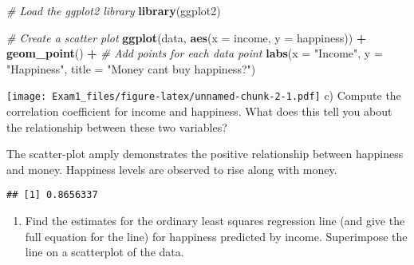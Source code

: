 \documentclass[
]{article}
\newenvironment{Shaded}{\begin{snugshade}}{\end{snugshade}}
\newcommand{\AttributeTok}[1]{\textcolor[rgb]{0.13,0.29,0.53}{#1}}
\newcommand{\CommentTok}[1]{\textcolor[rgb]{0.56,0.35,0.01}{\textit{#1}}}
\newcommand{\FunctionTok}[1]{\textcolor[rgb]{0.13,0.29,0.53}{\textbf{#1}}}
\newcommand{\NormalTok}[1]{#1}
\newcommand{\OtherTok}[1]{\textcolor[rgb]{0.56,0.35,0.01}{#1}}
\newcommand{\SpecialCharTok}[1]{\textcolor[rgb]{0.81,0.36,0.00}{\textbf{#1}}}
\newcommand{\StringTok}[1]{\textcolor[rgb]{0.31,0.60,0.02}{#1}}
\providecommand{\tightlist}{%
  \setlength{\itemsep}{0pt}\setlength{\parskip}{0pt}}
\begin{document}
\begin{Shaded}
\begin{Highlighting}[]
\CommentTok{\# Load the ggplot2 library}
\FunctionTok{library}\NormalTok{(ggplot2)}

\CommentTok{\# Create a scatter plot}
\FunctionTok{ggplot}\NormalTok{(data, }\FunctionTok{aes}\NormalTok{(}\AttributeTok{x =}\NormalTok{ income, }\AttributeTok{y =}\NormalTok{ happiness)) }\SpecialCharTok{+}
  \FunctionTok{geom\_point}\NormalTok{() }\SpecialCharTok{+}  \CommentTok{\# Add points for each data point}
  \FunctionTok{labs}\NormalTok{(}\AttributeTok{x =} \StringTok{"Income"}\NormalTok{, }\AttributeTok{y =} \StringTok{"Happiness"}\NormalTok{, }\AttributeTok{title =} \StringTok{"Money can\textquotesingle{}t buy happiness?"}\NormalTok{)}
\end{Highlighting}
\end{Shaded}

\texttt{[image: Exam1\_files/figure-latex/unnamed-chunk-2-1.pdf]} c)
Compute the correlation coefficient for income and happiness. What does
this tell you about the relationship between these two variables?

The scatter-plot amply demonstrates the positive relationship between
happiness and money. Happiness levels are observed to rise along with
money.

\begin{Shaded}
\end{Shaded}

\begin{verbatim}
## [1] 0.8656337
\end{verbatim}

\begin{enumerate}
\def\labelenumi{\alph{enumi})}
\setcounter{enumi}{3}
\tightlist
\item
  Find the estimates for the ordinary least squares regression line (and
  give the full equation for the line) for happiness predicted by
  income. Superimpose the line on a scatterplot of the data.
\end{enumerate}
\end{document}
